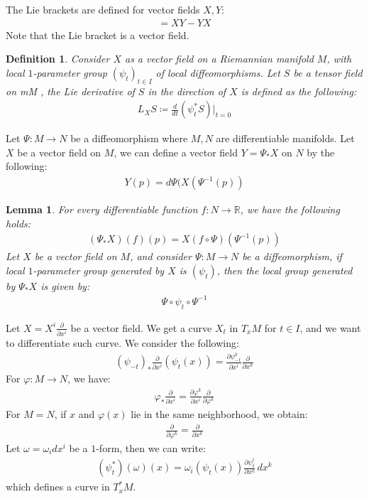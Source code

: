 \documentclass[11pt]{book}
\theoremstyle{break}
\theoremstyle{break}
\newtheorem{lem}{Lemma}[thm]
\newtheorem{defn}{Definition}[corL]
\newcommand{\R}{\mathbb{R}}
\newcommand{\pd}{\partial}
\begin{document}
\newpage
The Lie brackets are defined for vector fields $X,Y$:
\begin{align*}
[X,Y] = XY - YX
\end{align*}
Note that the Lie bracket is a vector field.
\begin{defn}
Consider $X$ as a vector field on a Riemannian manifold $M$, with local $1$-parameter group $(\psi_t)_{t \in I}$ of local diffeomorphisms. Let $S$ be a tensor field on mM , the Lie derivative of $S$ in the direction of $X$ is defined as the following:
\begin{align*}
L_XS\coloneqq \frac{d}{dt}\left( \psi_t^* S\right) |_{t=0} 
\end{align*}
\end{defn}

\newpage
Let $\Psi:M \to N$ be a diffeomorphism where $M,N$ are differentiable manifolds. Let $X$ be a vector field on $M$, we can define a vector field $Y = \Psi_*X$ on $N$ by the following:
\begin{align*}
Y(p) = d\Psi (X(\Psi^{-1}(p))
\end{align*}

\begin{lem}
For every differentiable function $f:N \to \R$, we have the following holds:
\begin{align*}
(\Psi_*X)(f)(p) = X(f\circ \Psi)(\Psi^{-1}(p))
\end{align*}
Let $X$ be a vector field on $M$, and consider $\Psi:M \to N$ be a diffeomorphism, if local $1$-parameter group generated by $X$ is $(\psi_t)$, then the local group generated by $\Psi_*X$ is given by:
\begin{align*}
\Psi \circ \psi_t \circ \Psi^{-1}
\end{align*}
\end{lem}



Let $X = X^i \frac{\pd}{\pd x^i}$ be a vector field. We get a curve $X_t$ in $T_xM$ for $t \in I$, and we want to differentiate such curve. We consider the following:
\begin{align*}
\left( \psi_{-t}\right)_* \frac{\pd}{\pd x^i}\left( \psi_t(x) \right) = \frac{\pd \psi_{-t}^k}{\pd x^i} \frac{\pd}{\pd x^k} 
\end{align*}
For $\varphi:M \to N$, we have:
\begin{align*}
\varphi_*\frac{\pd}{\pd x^i} = \frac{\pd \varphi^k}{\pd x^i}\frac{\pd}{\pd \varphi^k}
\end{align*}
For $M = N$, if $x$ and $\varphi(x) $ lie in the same neighborhood, we obtain:
\begin{align*}
\frac{\pd}{\pd \varphi^k} = \frac{\pd}{\pd x^k}
\end{align*}
Let $\omega = \omega_i dx^i$ be a $1$-form, then we can write:
\begin{align*}
\left( \psi^*_t\right) (\omega)(x) = \omega_i \left( \psi_t(x) \right) \frac{\pd \psi_t^i}{\pd x^k}\, dx^k
\end{align*}
which defines a curve in $T_x^*M$.\\
\end{document}
